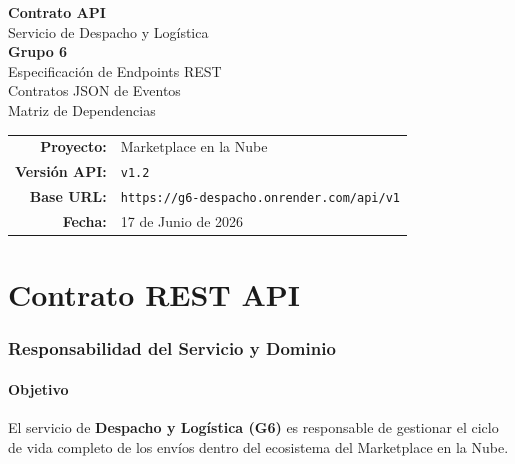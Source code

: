 \documentclass[11pt, a4paper]{article}
\begin{document}
\begin{titlepage}
\centering
\vspace*{2.5cm}

{\Huge\bfseries\textcolor{primary}{Contrato API}}\\[0.3cm]
{\LARGE\textcolor{primary!70}{Servicio de Despacho y Logística}}\\[0.5cm]
{\Large\textcolor{accent}{\textbf{Grupo 6}}}\\[2cm]

{\large Especificación de Endpoints REST}\\[0.2cm]
{\large Contratos JSON de Eventos}\\[0.2cm]
{\large Matriz de Dependencias}\\[3cm]

\begin{tabular}{rl}
  \textbf{Proyecto:}     & Marketplace en la Nube \\
  \textbf{Versión API:}  & \texttt{v1.2} \\
  \textbf{Base URL:}     & \texttt{https://g6-despacho.onrender.com/api/v1} \\
  \textbf{Fecha:}        & 17 de Junio de 2026 \\
\end{tabular}

\vfill



\end{titlepage}

\tableofcontents
\newpage


\part{Contrato REST API}

\section{Responsabilidad del Servicio y Dominio}

\subsection{Objetivo}

El servicio de \textbf{Despacho y Logística (G6)} es responsable de gestionar el ciclo de vida completo de los envíos dentro del ecosistema del Marketplace en la Nube.
\end{document}
